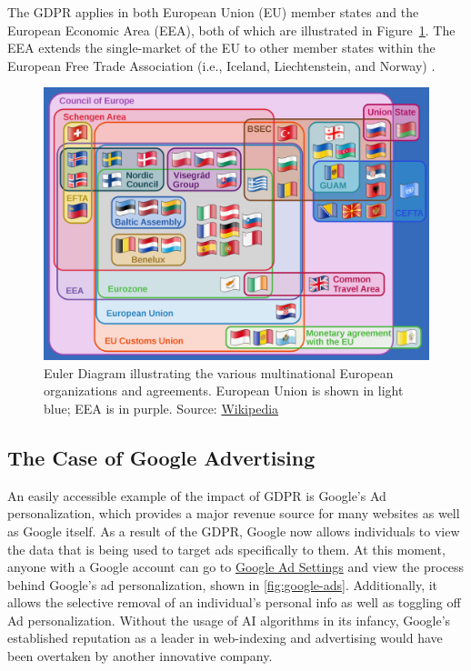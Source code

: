 \documentclass[
	letterpaper, %
]{jdf}
\begin{document}
The GDPR applies in both European Union (EU) member states and the European Economic Area (EEA), both of which are illustrated in Figure~\ref{fig:europe-groups}. The EEA extends the single-market of the EU to other member states within the European Free Trade Association (i.e., Iceland, Liechtenstein, and Norway) \href{https://www.efta.int/eea/eea-agreement/eea-basic-features#1}{\cite{efta}}.
\begin{figure}[H]
	\centering
	\includegraphics[width=0.7\linewidth]{../figures/europe-groups}
	\caption{Euler Diagram illustrating the various multinational European organizations and agreements. European Union is shown in light blue; EEA is in purple. Source: \href{https://en.wikipedia.org/wiki/File:Supranational_European_Bodies-en.svg}{Wikipedia}
	}
	\label{fig:europe-groups}
\end{figure}



\subsection{The Case of Google Advertising}
An easily accessible example of the impact of GDPR is Google's Ad personalization, which provides a major revenue source for many websites as well as Google itself. As a result of the GDPR, Google now allows individuals to view the data that is being used to target ads specifically to them. At this moment, anyone with a Google account can go to \href{https://adssettings.google.com/}{Google Ad Settings} and view the process behind Google's ad personalization, shown in \ref{fig:google-ads}. Additionally, it allows the selective removal of an individual's personal info as well as toggling off Ad personalization. Without the usage of AI algorithms in its infancy, Google's established reputation as a leader in web-indexing and advertising would have been overtaken by another innovative company. 
\end{document}
